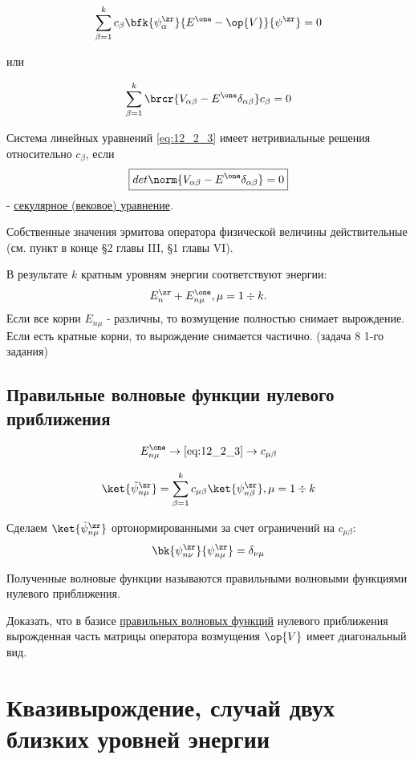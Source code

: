 $$
\sum_{\beta=1}^k c_\beta \bfk{\psi_{\alpha}^\zr}{E^\one - \op{V}}{\psi^\zr} = 0
$$

или 

\begin{equation}
\label{eq:12_2_3}
\sum_{\beta=1}^k \brcr{V_{\alpha \beta} - E^\one \delta_{\alpha \beta}} c_\beta = 0
\end{equation}  

Система линейных уравнений \eqref{eq:12_2_3} имеет нетривиальные решения относительно $c_\beta$, если 
\begin{equation}
\label{eq:12_2_4}
\boxed{det \norm{V_{\alpha \beta} - E^\one \delta_{\alpha \beta}} = 0}
\end{equation} 
- \underline{секулярное (вековое) уравнение}.

Собственные значения эрмитова оператора физической величины действительные (см. пункт в конце \S 2 главы III, \S 1 главы VI).

В результате $k$ кратным уровням энергии соответствуют энергии: 
$$
E_n^\zr + E_{n \mu} ^\one, \mu = 1 \div k.
$$
Если все корни $E_{n \mu}$ - различны, то возмущение полностью снимает вырождение. Если есть кратные корни, то вырождение снимается частично. (задача 8 1-го задания)

\subsection{Правильные волновые функции нулевого приближения}

$$
E_{n \mu}^\one \to \eqref{eq:12_2_3} \to c_{\mu \beta}
$$

$$
\ket{\tilde{\psi}_{n \mu}^\zr} = \sum_{\beta=1}^k c_{\mu \beta} \ket{\psi_{n \beta}^\zr}, \mu = 1 \div k
$$

Сделаем $\ket{\tilde{\psi}_{n \mu}^\zr}$ ортонормированными за счет ограничений на $c_{\mu \beta}$:
$$
\bk{\psi_{n \nu}^\zr}{\psi_{n \mu}^\zr} = \delta_{\nu \mu}
$$

Полученные волновые функции называются правильными волновыми функциями нулевого приближения.

\begin{excr}
Доказать, что в базисе \underline{правильных волновых функций} нулевого приближения вырожденная часть матрицы оператора возмущения $\op{V}$ имеет диагональный вид.
\end{excr}

\section{Квазивырождение, случай двух близких уровней энергии}

